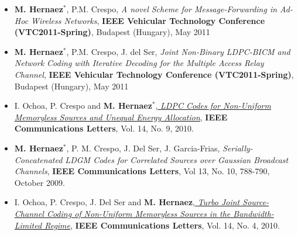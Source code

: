 \documentclass[11pt,a4paper,sans]{moderncv}        %
\begin{document}
\begin{itemize}
\item \textbf{M. Hernaez}$^\ast$, P.M. Crespo, \emph{A novel Scheme for Message-Forwarding in Ad-Hoc Wireless Networks}, \textbf{IEEE Vehicular Technology Conference (VTC2011-Spring)}, Budapest (Hungary), May 2011 \\

\item \textbf{M. Hernaez}$^\ast$, P.M. Crespo, J. del Ser, \emph{ Joint Non-Binary LDPC-BICM and Network Coding with Iterative Decoding for the Multiple Access Relay Channel}, \textbf{IEEE Vehicular Technology Conference (VTC2011-Spring)}, Budapest (Hungary),  May 2011 \\

\item I. Ochoa, P. Crespo and \textbf{M. Hernaez}$^\ast$,\href{http://web.stanford.edu/~iochoa/publishedPublications/2010_ldpc_paper.pdf} {\emph{ LDPC Codes for Non-Uniform Memoryless Sources and Unequal Energy Allocation}}, \textbf{IEEE Communications Letters}, Vol. 14, No. 9, 2010.\\

\item \textbf{M. Hernaez}$^\ast$, P. M. Crespo, J. {Del Ser}, J. Garcia-Frias, {\emph{ Serially-Concatenated LDGM Codes for Correlated Sources over Gaussian Broadcast Channels}}, \textbf{IEEE Communications Letters}, Vol 13, No. 10, 788-790, October 2009.\\

\item I. Ochoa, P. Crespo, J. Del Ser and \textbf{M. Hernaez},\href{http://web.stanford.edu/~iochoa/publishedPublications/2010_turbo_paper.pdf} {\emph{ Turbo Joint Source-Channel Coding of Non-Uniform Memoryless Sources in the Bandwidth-Limited Regime}}, \textbf{IEEE Communications Letters}, Vol. 14, No. 4, 2010.\\

\end{itemize}


\end{document}
